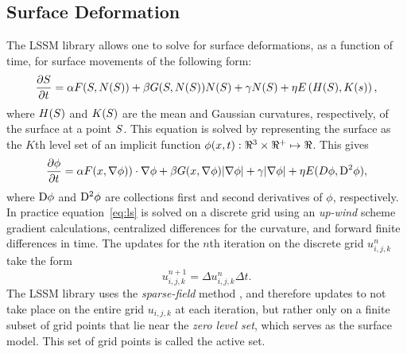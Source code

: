 \subsection{Surface Deformation}
The LSSM library allows one to solve for surface deformations, as a
function
of time, for surface movements of the following form:
\begin{equation}
\frac{\partial {\boldmath S}}{\partial t}
= \alpha {\boldmath F}({\boldmath S}, {\boldmath N}({\boldmath S})) + \beta G({\boldmath S},
{\boldmath N}({\boldmath S})) {\boldmath N}({\boldmath S}) + \gamma {\boldmath N}({\boldmath S})
+ \eta E\left( H({\boldmath S}), K({\boldmath s}) \right),
\end{equation}
where $H({\boldmath S})$ and $K({\boldmath S})$ are the mean and Gaussian
curvatures, respectively, of the surface at a point ${\boldmath S}$.
This equation is solved by
representing the surface as the $K$th level set of an implicit
function $\phi({\boldmath x}, t):\Re^{3}\times\Re^{+}
\mapsto \Re$.  This gives
\begin{equation}
\frac{\partial \phi}{\partial t}
= \alpha {\boldmath F}({\boldmath x}, \nabla \phi)) \cdot \nabla \phi + \beta G({\boldmath x},
\nabla \phi) |\nabla \phi| + \gamma |\nabla \phi| +
\eta E(D \phi, {\rm D}^{2} \phi),
\label{eq:ls}
\end{equation}
where ${\rm D} \phi$ and
${\rm D}^{2} \phi$ are collections first and second derivatives of
$\phi$, respectively.
In practice equation~\ref{eq:ls} is solved on a discrete grid using
an {\em up-wind} scheme gradient calculations, centralized differences
for the curvature, and forward finite differences in time.
The updates for the $n$th iteration
on the discrete grid $u^{n}_{i, j, k}$ take the form
\begin{equation}
u^{n + 1}_{i, j, k} = \Delta u^{n}_{i, j, k} \Delta t.
\label{eq:update}
\end{equation}
The LSSM library uses the {\em sparse-field} method \cite{whi98}, and
therefore updates to not take place on the entire grid $u_{i, j, k}$
at each iteration, but rather only on a finite subset of grid points
that lie near the {\em zero level set}, which serves as the surface
model.  This set of grid points is called the active set.

